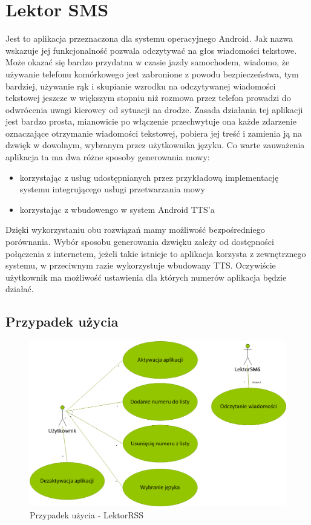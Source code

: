 \section{Lektor SMS}
Jest to aplikacja przeznaczona dla systemu operacyjnego Android. Jak nazwa wskazuje jej funkcjonalność pozwala odczytywać na głos wiadomości tekstowe. Może okazać się bardzo przydatna w czasie jazdy samochodem, wiadomo, że używanie telefonu komórkowego jest zabronione z powodu bezpieczeństwa, tym bardziej, używanie rąk i skupianie wzrodku na odczytywanej wiadomości tekstowej jeszcze w większym stopniu niż rozmowa przez telefon prowadzi do odwrócenia uwagi kierowcy od sytuacji na drodze.
Zasada działania tej aplikacji jest bardzo prosta, mianowicie po włączenie przechwytuje ona każde zdarzenie oznaczające otrzymanie wiadomości tekstowej, pobiera jej treść i zamienia ją na dzwięk w dowolnym, wybranym przez użytkownika języku. Co warte zauważenia aplikacja ta ma dwa różne sposoby generowania mowy:
\begin{itemize}
	\item korzystając z usług udostępnianych przez przykładową implementację systemu integrującego usługi przetwarzania mowy
	\item korzystając z wbudowengo w system Android TTS'a
\end{itemize} 
Dzięki wykorzystaniu obu rozwiązań mamy możliwość bezpośredniego porównania. Wybór sposobu generowania dzwięku zależy od dostępności połączenia z internetem, jeżeli takie istnieje to aplikacja korzysta z zewnętrznego systemu, w przeciwnym razie wykorzystuje wbudowany TTS. Oczywiście użytkownik ma możliwość ustawienia dla których numerów aplikacja będzie działać.
\newpage
\subsection{Przypadek użycia}
\begin{figure}[!h]
	\centering
	\includegraphics[scale=0.45]{useCaseLektorSMS.png} 
	\caption{Przypadek użycia - LektorRSS}
\end{figure}

